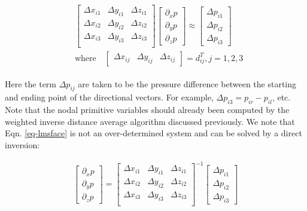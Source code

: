 \documentclass[12pt, letterpaper]{report}
\begin{document}
\begin{align}\label{eq-lmsface1}
   \begin{split}
      &\begin{bmatrix}
         \Delta x_{i1} & \Delta y_{i1} & \Delta z_{i1} \\
         \Delta x_{i2} & \Delta y_{i2} & \Delta z_{i2} \\
         \Delta x_{i3} & \Delta y_{i3} & \Delta z_{i3} \\
      \end{bmatrix} \begin{bmatrix}\partial_x p \\ \partial_y p \\ \partial_z p\end{bmatrix} \approx
      \begin{bmatrix}\Delta p_{i1} \\\Delta p_{i2} \\\Delta p_{i3} 
         \end{bmatrix} \\ &\textrm{where} \quad \begin{bmatrix}\Delta x_{ij} & \Delta y_{ij} &
      \Delta z_{ij}\end{bmatrix} = d_{ij}^T, j = 1,2,3
   \end{split}
\end{align}

Here the term $\Delta p_{ij}$ are taken to be the pressure difference between the starting and
ending point of the directional vectors. For example, $\Delta p_{i3} = p_{ir} - p_{il}$, etc. Note
that the nodal primitive variables should already been computed by the weighted inverse distance
average algorithm discussed previously. We note that Eqn. \ref{eq-lmsface} is not an over-determined
system and can be solved by a direct inversion:

\begin{align}\label{eq-lmsface2}
   \begin{bmatrix}\partial_x p \\ \partial_y p \\ \partial_z p\end{bmatrix} = 
      \begin{bmatrix}
         \Delta x_{i1} & \Delta y_{i1} & \Delta z_{i1} \\
         \Delta x_{i2} & \Delta y_{i2} & \Delta z_{i2} \\
         \Delta x_{i3} & \Delta y_{i3} & \Delta z_{i3} \\
      \end{bmatrix}^{-1} \begin{bmatrix}\Delta p_{i1} \\\Delta p_{i2} \\\Delta p_{i3}\end{bmatrix}
\end{align}
\end{document}
